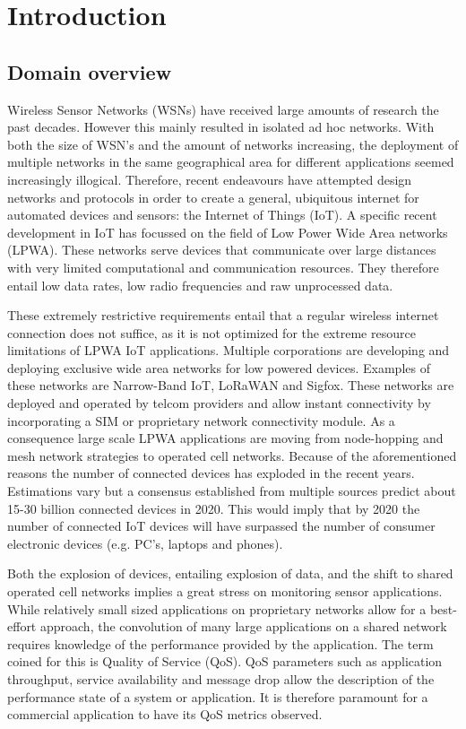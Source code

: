 \chapter{Introduction}

\section{Domain overview} 
Wireless Sensor Networks (WSNs) have received large amounts of research the past decades. However this mainly resulted in isolated ad hoc networks. With both the size of WSN's and the amount of networks increasing, the deployment of multiple networks in the same geographical area for different applications seemed increasingly illogical. Therefore, recent endeavours have attempted design networks and protocols in order to create a general, ubiquitous internet for automated devices and sensors: the Internet of Things (IoT). A specific recent development in IoT has focussed on the field of Low Power Wide Area networks (LPWA). These networks serve devices that communicate over large distances with very limited computational and communication resources. They therefore entail low data rates, low radio frequencies and raw unprocessed data. 

These extremely restrictive requirements entail that a regular wireless internet connection does not suffice, as it is not optimized for the extreme resource limitations of LPWA IoT applications. Multiple corporations are developing and deploying exclusive wide area networks for low powered devices. Examples of these networks are Narrow-Band IoT\cite{nbiot}, LoRaWAN\cite{web:lora} and Sigfox\cite{web:sigfox}. These networks are deployed and operated by telcom providers and allow instant connectivity by incorporating a SIM or proprietary network connectivity module. As a consequence large scale LPWA applications are moving from node-hopping and mesh network strategies to operated cell networks\cite{needs source}. Because of the aforementioned reasons the number of connected devices has exploded in the recent years. Estimations vary but a consensus established from multiple sources predict about 15-30 billion connected devices in 2020. This would imply that by 2020 the number of connected IoT devices will have surpassed the number of consumer electronic devices (e.g. PC's, laptops and phones)\cite{nr_devices_ericsson}. 

Both the explosion of devices, entailing explosion of data, and the shift to shared operated cell networks implies a great stress on monitoring sensor applications. While relatively small sized applications on proprietary networks allow for a best-effort approach, the convolution of many large applications on a shared network requires knowledge of the performance provided by the application. The term coined for this is Quality of Service (QoS). QoS parameters such as application throughput, service availability and message drop allow the description of the performance state of a system or application. It is therefore paramount for a commercial application to have its QoS metrics observed. 

